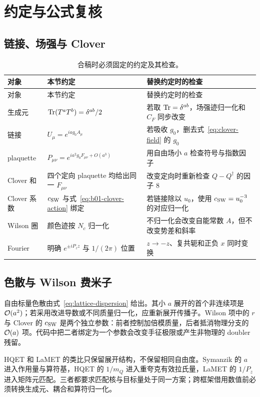 \chapter{约定与公式复核}

\section{链接、场强与 Clover}

\begin{longtable}{L{4.0cm}L{4.0cm}L{5.8cm}}
\caption{合稿时必须固定的约定及其检查。}\label{tab:conventions}\\
\toprule
对象 & 本节约定 & 替换约定时的检查\\
\midrule
\endfirsthead
\toprule
对象 & 本节约定 & 替换约定时的检查\\
\midrule
\endhead
生成元 & \(\operatorname{Tr}(T^aT^b)=\delta^{ab}/2\) & 若取 \(\operatorname{Tr}=\delta^{ab}\)，场强迹归一化和 \(C_F\) 同步改变\\
链接 & \(U_\mu=e^{iag_0A_\mu}\) & 若吸收 \(g_0\)，删去式~\eqref{eq:clover-field} 的 \(g_0\)\\
plaquette & \(P_{\mu\nu}=e^{ia^2g_0F_{\mu\nu}+O(a^3)}\) & 用自由场小 \(a\) 检查符号与指数因子\\
Clover 和 & 四个定向 plaquette 均给出同一 \(F_{\mu\nu}\) & 改变定向时重新检查 \(Q-Q^\dagger\) 的因子 8\\
Clover 系数 & \(c_{\rm SW}\) 与式~\eqref{eq:b01-clover-action} 绑定 & 若链接除以 \(u_0\)，使用 \(c_{\rm SW}=u_0^{-3}\) 的对应归一化\\
Wilson 圈 & 颜色迹按 \(N_c\) 归一化 & 不归一化会改变自能常数 \(A\)，但不改变势差和斜率\\
Fourier & 明确 \(e^{\pm iP_zz}\) 与 \(1/(2\pi)\) 位置 & \(z\to-z\)、复共轭和正负 \(x\) 同时变换\\
\bottomrule
\end{longtable}

\section{色散与 Wilson 费米子}

自由标量色散由式~\eqref{eq:lattice-dispersion} 给出。其小 \(a\) 展开的首个非连续项是 \(\mathcal{O}(a^2)\)；若采用改进导数或不同质量归一化，应重新展开传播子。Wilson 项中的 \(r\) 与 Clover 的 \(c_{\rm SW}\) 是两个独立参数：前者控制加倍模质量，后者抵消物理分支的 \(\mathcal{O}(a)\) 项。代码中把二者绑定为一个参数会改变手征极限或产生非物理的 doubler 残留。

HQET 和 LaMET 的类比只保留展开结构，不保留相同自由度。Symanzik 的 \(a\) 进入作用量与算符基，HQET 的 \(1/m_Q\) 进入重夸克有效拉氏量，LaMET 的 \(1/P_z\) 进入矩阵元匹配。三者都要求匹配核与目标量处于同一方案；跨框架借用数值前必须转换生成元、耦合和算符归一化。

